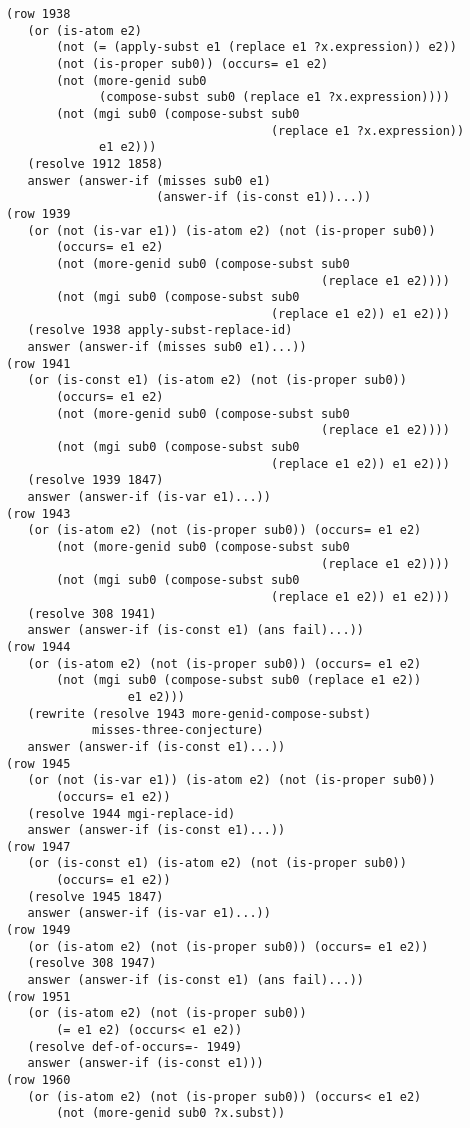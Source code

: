 \documentclass[runningheads]{llncs}
\begin{document}
\begin{verbatim}
(row 1938
   (or (is-atom e2)
       (not (= (apply-subst e1 (replace e1 ?x.expression)) e2))
       (not (is-proper sub0)) (occurs= e1 e2)
       (not (more-genid sub0
             (compose-subst sub0 (replace e1 ?x.expression))))
       (not (mgi sub0 (compose-subst sub0 
                                     (replace e1 ?x.expression))
             e1 e2)))
   (resolve 1912 1858)
   answer (answer-if (misses sub0 e1)
                     (answer-if (is-const e1))...))
(row 1939
   (or (not (is-var e1)) (is-atom e2) (not (is-proper sub0))
       (occurs= e1 e2)
       (not (more-genid sub0 (compose-subst sub0 
                                            (replace e1 e2))))
       (not (mgi sub0 (compose-subst sub0 
                                     (replace e1 e2)) e1 e2)))
   (resolve 1938 apply-subst-replace-id)
   answer (answer-if (misses sub0 e1)...))
(row 1941
   (or (is-const e1) (is-atom e2) (not (is-proper sub0))
       (occurs= e1 e2)
       (not (more-genid sub0 (compose-subst sub0 
                                            (replace e1 e2))))
       (not (mgi sub0 (compose-subst sub0 
                                     (replace e1 e2)) e1 e2)))
   (resolve 1939 1847)
   answer (answer-if (is-var e1)...))
(row 1943
   (or (is-atom e2) (not (is-proper sub0)) (occurs= e1 e2)
       (not (more-genid sub0 (compose-subst sub0 
                                            (replace e1 e2))))
       (not (mgi sub0 (compose-subst sub0 
                                     (replace e1 e2)) e1 e2)))
   (resolve 308 1941)
   answer (answer-if (is-const e1) (ans fail)...))
(row 1944
   (or (is-atom e2) (not (is-proper sub0)) (occurs= e1 e2)
       (not (mgi sub0 (compose-subst sub0 (replace e1 e2)) 
                 e1 e2)))
   (rewrite (resolve 1943 more-genid-compose-subst) 
            misses-three-conjecture)
   answer (answer-if (is-const e1)...))
(row 1945
   (or (not (is-var e1)) (is-atom e2) (not (is-proper sub0))
       (occurs= e1 e2))
   (resolve 1944 mgi-replace-id)
   answer (answer-if (is-const e1)...))
(row 1947
   (or (is-const e1) (is-atom e2) (not (is-proper sub0))
       (occurs= e1 e2))
   (resolve 1945 1847)
   answer (answer-if (is-var e1)...))
(row 1949
   (or (is-atom e2) (not (is-proper sub0)) (occurs= e1 e2))
   (resolve 308 1947)
   answer (answer-if (is-const e1) (ans fail)...))
(row 1951
   (or (is-atom e2) (not (is-proper sub0)) 
       (= e1 e2) (occurs< e1 e2))
   (resolve def-of-occurs=- 1949)
   answer (answer-if (is-const e1)))
(row 1960
   (or (is-atom e2) (not (is-proper sub0)) (occurs< e1 e2)
       (not (more-genid sub0 ?x.subst)) 

\end{verbatim}
\end{document}
